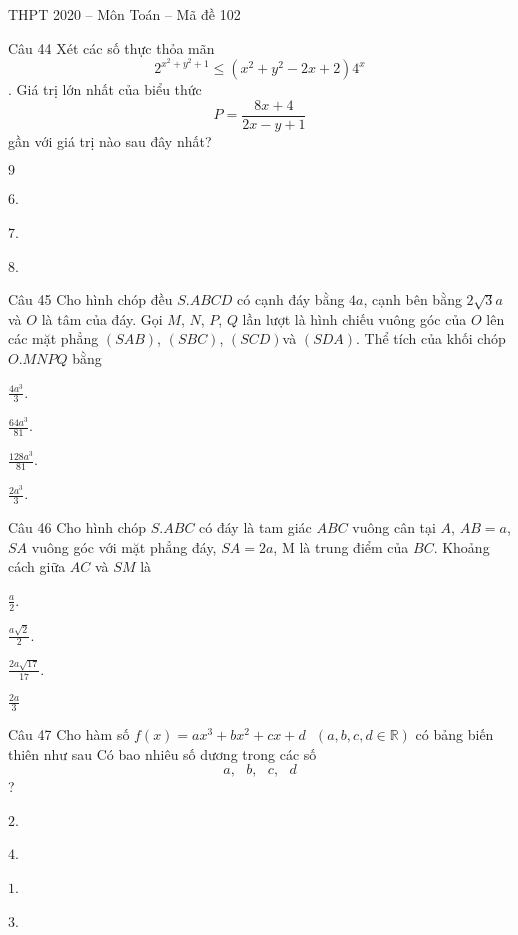\documentclass{book}
\begin{document}
\begin{quiz}{THPT 2020 – Môn Toán – Mã đề 102}
\begin{multi}[points=1]{Câu 44}
 Xét các số thực thỏa mãn \[{{2}^{{{x}^{2}}+{{y}^{2}}+1}}\le \left( {{x}^{2}}+{{y}^{2}}-2x+2 \right){{4}^{x}}\]. Giá trị lớn nhất của biểu thức \[P=\frac{8x+4}{2x-y+1}\] gần với giá trị nào sau đây nhất? 

\item  $9$	
\item  $6$.	
\item*  $7$.	
\item  $8$.
\end{multi}

\begin{multi}[points=1]{Câu 45}
 Cho hình chóp đều $S.ABCD$ có cạnh đáy bằng $4a$, cạnh bên bằng $2\sqrt{3}a$ và $O$ là tâm của đáy. Gọi $M$, $N$, $P$, $Q$ lần lượt là hình chiếu vuông góc của $O$ lên các mặt phẳng $(SAB)$, $(SBC)$, $(SCD)$và $(SDA)$. Thể tích của khối chóp $O.MNPQ$ bằng

\item  $\frac{4{{a}^{3}}}{3}$.	
\item  $\frac{64{{a}^{3}}}{81}$.	
\item  $\frac{128{{a}^{3}}}{81}$.	
\item*  $\frac{2{{a}^{3}}}{3}$.
\end{multi}

\begin{multi}[points=1]{Câu 46}
 Cho hình chóp $S.ABC$ có đáy là tam giác $ABC$ vuông cân tại $A$, $AB=a$, $SA$ vuông góc với mặt phẳng đáy, $SA=2a$, M là trung điểm của $BC$. Khoảng cách giữa $AC$ và $SM$ là

\item  $\frac{a}{2}$.	
\item  $\frac{a\sqrt{2}}{2}$.	
\item*  $\frac{2a\sqrt{17}}{17}$.	
\item  $\frac{2a}{3}$
\end{multi}

\begin{multi}[points=1]{Câu 47}
 Cho hàm số $f\left( x \right)=a{{x}^{3}}+b{{x}^{2}}+cx+d\text{  }\left( a,b,c,d\in \mathbb{R} \right)$ có bảng biến thiên như sau
Có bao nhiêu số dương trong các số \[a,\text{ }b,\text{ }c,\text{ }d\]?

\item  $2$.	
\item  $4$.	
\item  $1$.	
\item*  $3$.
\end{multi}


\end{quiz}
\end{document}
